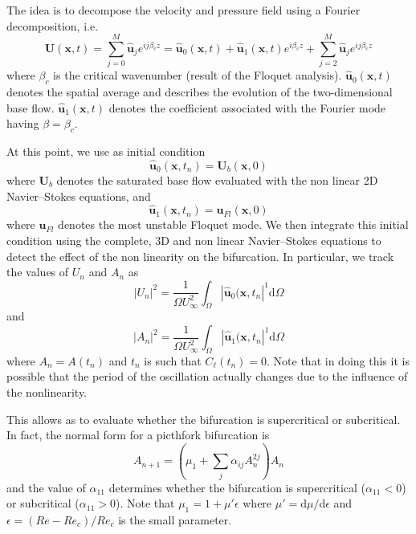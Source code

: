 The idea is to decompose the velocity and pressure field using a Fourier decomposition, i.e.
%
\begin{equation}
  \bm{U}(\bm{x},t) = \sum_{j=0}^M \hat{\bm{u}}_j e^{i j \beta_c z} = \hat{\bm{u}}_0(\bm{x},t) + \hat{\bm{u}}_1(\bm{x},t) e^{i \beta_c z}+
                     \sum_{j=2}^M \hat{\bm{u}}_j e^{i j \beta_c z} 
\end{equation}
%
where $\beta_c$ is the critical wavenumber (result of the Floquet analysis). $\hat{\bm{u}}_0(\bm{x},t)$ denotes the spatial average and describes the evolution of the two-dimensional base flow. $\hat{\bm{u}}_1(\bm{x},t)$ denotes the coefficient associated with the Fourier mode having $\beta = \beta_c$.

At this point, we use as initial condition 
%
\begin{equation}
  \hat{\bm{u}}_0(\bm{x},t_n) = \bm{U}_b(\bm{x},0)
\end{equation}
%
where $\bm{U}_b$ denotes the saturated base flow evaluated with the non linear 2D Navier--Stokes equations, and
%
\begin{equation}
  \hat{\bm{u}}_1(\bm{x},t_n) = \bm{u}_{Fl}(\bm{x},0)
\end{equation}
%
where $\bm{u}_{Fl}$ denotes the most unstable Floquet mode.
We then integrate this initial condition using the complete, 3D and non linear Navier--Stokes equations to detect the effect of the non linearity on the bifurcation. In particular, we track the values of $U_n$ and $A_n$ as
%
\begin{equation}
  |U_n|^2 = \frac{1}{\Omega U_\infty^2} \int_{\Omega} | \hat{\bm{u}}_0(\bm{x},t_n |^1 \text{d}\Omega
\end{equation}
%
and
\begin{equation}
  |A_n|^2 = \frac{1}{\Omega U_\infty^2} \int_{\Omega} | \hat{\bm{u}}_1(\bm{x},t_n |^1 \text{d}\Omega
\end{equation}
%
where $A_n=A(t_n)$ and $t_n$ is such that $C_\ell(t_n) = 0$. Note that in doing this it is possible that the period of the oscillation actually changes due to the influence of the nonlinearity.

This allows as to evaluate whether the bifurcation is supercritical or subcritical. In fact, the normal form for a picthfork bifurcation is
%
\begin{equation}
  A_{n+1} = \left( \mu_1 + \sum_j \alpha_{ij}A_n^{2j} \right) A_n
\end{equation}
%
and the value of $\alpha_{11}$ determines whether the bifurcation is supercritical ($\alpha_{11}<0$) or subcritical ($\alpha_{11}>0$). Note that $\mu_1 = 1 + \mu'\epsilon$ where $\mu' = \text{d}\mu/\text{d}\epsilon$ and $\epsilon = (Re - Re_c)/Re_c$ is the small parameter.

